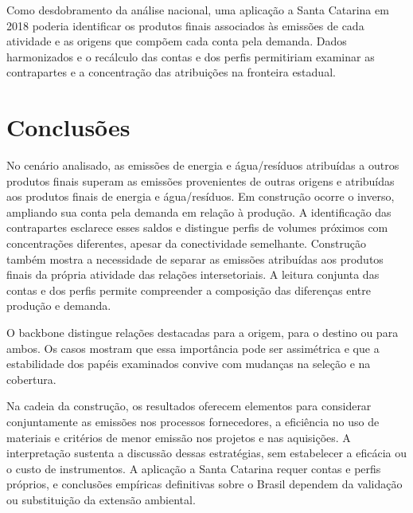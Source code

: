 \documentclass[11pt]{article}
\begin{document}
Como desdobramento da análise nacional, uma aplicação a Santa Catarina em 2018 poderia identificar os produtos finais associados às emissões de cada atividade e as origens que compõem cada conta pela demanda. Dados harmonizados e o recálculo das contas e dos perfis permitiriam examinar as contrapartes e a concentração das atribuições na fronteira estadual.

\section{Conclusões}

No cenário analisado, as emissões de energia e água/resíduos atribuídas a outros produtos finais superam as emissões provenientes de outras origens e atribuídas aos produtos finais de energia e água/resíduos. Em construção ocorre o inverso, ampliando sua conta pela demanda em relação à produção. A identificação das contrapartes esclarece esses saldos e distingue perfis de volumes próximos com concentrações diferentes, apesar da conectividade semelhante. Construção também mostra a necessidade de separar as emissões atribuídas aos produtos finais da própria atividade das relações intersetoriais. A leitura conjunta das contas e dos perfis permite compreender a composição das diferenças entre produção e demanda.

O backbone distingue relações destacadas para a origem, para o destino ou para ambos. Os casos mostram que essa importância pode ser assimétrica e que a estabilidade dos papéis examinados convive com mudanças na seleção e na cobertura.

Na cadeia da construção, os resultados oferecem elementos para considerar conjuntamente as emissões nos processos fornecedores, a eficiência no uso de materiais e critérios de menor emissão nos projetos e nas aquisições. A interpretação sustenta a discussão dessas estratégias, sem estabelecer a eficácia ou o custo de instrumentos. A aplicação a Santa Catarina requer contas e perfis próprios, e conclusões empíricas definitivas sobre o Brasil dependem da validação ou substituição da extensão ambiental.

\clearpage
\begingroup
{}
\raggedright
\printbibliography[title={Referências}]
\endgroup

\end{document}
